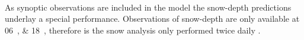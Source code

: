 \\
As synoptic observations are included in the model the snow-depth predictions underlay a special performance. Observations of snow-depth are only available at \SIlist{06;18}{\UTC}, therefore is the snow analysis only performed twice daily \citep{muller_arome-metcoop:_2017, homleid_verification_2016}. 
%
